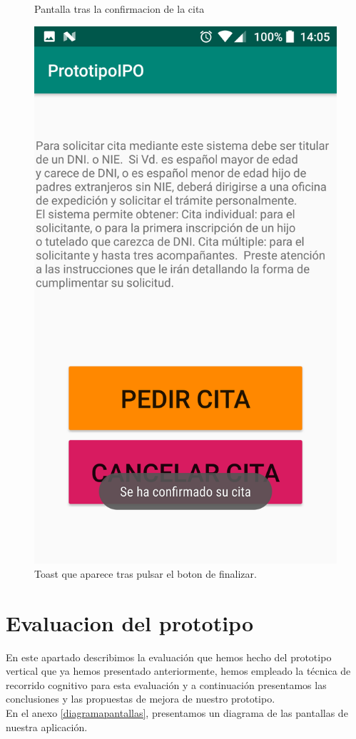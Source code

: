 \documentclass[a4paper,11pt]{article}
\begin{document}
\begin{figure}[H]
\begin{minipage}{.45\linewidth}
\caption{Pantalla tras la confirmacion de la cita}
\label{confirmacion1}
\end{minipage}
\begin{minipage}{0.45\linewidth}
\includegraphics[width=\textwidth]{13.png}
\caption{Toast que aparece tras pulsar el boton de finalizar.}
\label{confirmacion2}
\end{minipage}
\end{figure}


\section{Evaluacion del prototipo}
En este apartado describimos la evaluación que hemos hecho del prototipo vertical que ya hemos presentado anteriormente, hemos empleado la técnica de recorrido cognitivo para esta evaluación y a continuación presentamos las conclusiones y las propuestas de mejora de nuestro prototipo.\\
En el anexo \ref{diagramapantallas}, presentamos un diagrama de las pantallas de nuestra aplicación.
\end{document}
